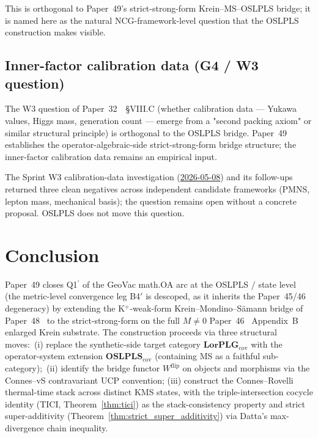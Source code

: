 \documentclass[11pt,a4paper]{article}
\theoremstyle{plain}
\theoremstyle{definition}
\newcommand{\LorPLG}{\mathbf{LorPLG}_{\mathrm{cov}}}
\newcommand{\OSLPLS}{\mathbf{OSLPLS}_{\mathrm{cov}}}
\newcommand{\Wflip}{W^{\mathrm{flip}}}
\begin{document}
This is orthogonal to Paper~49's strict-strong-form Krein--MS--OSLPLS
bridge; it is named here as the natural NCG-framework-level question
that the OSLPLS construction makes visible.

\subsection{Inner-factor calibration data (G4 / W3 question)}
\label{sec:open_g4}

The W3 question of Paper~32~\cite{paper32}~\S VIII.C (whether
calibration data --- Yukawa values, Higgs mass, generation count ---
emerge from a "second packing axiom" or similar structural
principle) is orthogonal to the OSLPLS bridge. Paper~49 establishes
the operator-algebraic-side strict-strong-form bridge structure; the
inner-factor calibration data remains an empirical input.

The Sprint W3 calibration-data investigation
(\href{https://arxiv.org/abs/2603.07189}{2026-05-08}) and its
follow-ups returned three clean negatives across independent
candidate frameworks (PMNS, lepton mass, mechanical basis); the
question remains open without a concrete proposal. OSLPLS does not
move this question.

\section{Conclusion}\label{sec:conclusion}

Paper~49 closes Q1$^{\prime}$ of the GeoVac math.OA arc at the OSLPLS /
state level (the metric-level convergence leg B4$'$ is descoped, as it
inherits the Paper~45/46 degeneracy) by extending
the K$^{+}$-weak-form Krein--Mondino--S\"amann bridge of
Paper~48~\cite{paper48} to the strict-strong-form on the full
$M\ne 0$ Paper~46~\cite{paper46} Appendix~B enlarged Krein substrate.
The construction proceeds via three structural moves:\ (i) replace
the synthetic-side target category $\LorPLG$ with the operator-system
extension $\OSLPLS$ (containing MS as a faithful sub-category);\
(ii) identify the bridge functor $\Wflip$ on objects and morphisms
via the Connes--vS contravariant UCP convention; (iii) construct the
Connes--Rovelli thermal-time stack across distinct KMS states, with
the triple-intersection cocycle identity (TICI,
Theorem~\ref{thm:tici}) as the stack-consistency property and
strict super-additivity (Theorem~\ref{thm:strict_super_additivity})
via Datta's max-divergence chain inequality.
\end{document}
